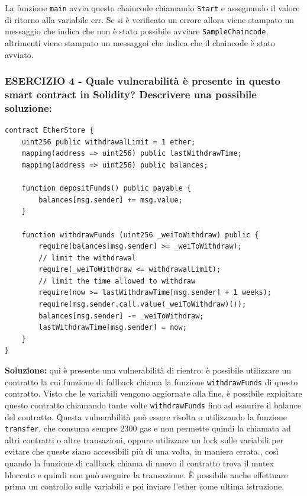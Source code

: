 La funzione \texttt{main} avvia questo chaincode chiamando \texttt{Start} e assegnando il valore di ritorno alla variabile err. Se si è verificato un errore allora viene stampato un messaggio che indica che non è stato possibile avviare \texttt{SampleChaincode}, altrimenti viene stampato un messaggoi che indica che il chaincode è stato avviato.

\vspace{5mm}

\subsubsection{ESERCIZIO 4 - Quale vulnerabilità è presente in questo smart contract in Solidity? Descrivere una possibile soluzione:}
\begin{lstlisting}[language=Solidity]
contract EtherStore {
    uint256 public withdrawalLimit = 1 ether;
    mapping(address => uint256) public lastWithdrawTime;
    mapping(address => uint256) public balances;

    function depositFunds() public payable {
        balances[msg.sender] += msg.value;
    }

    function withdrawFunds (uint256 _weiToWithdraw) public {
        require(balances[msg.sender] >= _weiToWithdraw);
        // limit the withdrawal
        require(_weiToWithdraw <= withdrawalLimit);
        // limit the time allowed to withdraw
        require(now >= lastWithdrawTime[msg.sender] + 1 weeks);
        require(msg.sender.call.value(_weiToWithdraw)());
        balances[msg.sender] -= _weiToWithdraw;
        lastWithdrawTime[msg.sender] = now;
    }
}
\end{lstlisting}
\textbf{Soluzione:} qui è presente una vulnerabilità di rientro: è possibile utilizzare un contratto la cui funzione di fallback chiama la funzione \texttt{withdrawFunds} di questo contratto. Visto che le variabili vengono aggiornate alla fine, è possibile exploitare questo contratto chiamando tante volte \texttt{withdrawFunds} fino ad esaurire il balance del contratto. Questa vulnerabilità può essere risolta o utilizzando la funzione \texttt{transfer}, che consuma sempre 2300 gas e non permette quindi la chiamata ad altri contratti o altre transazioni, oppure utilizzare un lock sulle variabili per evitare che queste siano accessibili più di una volta, in maniera errata., così quando la funzione di callback chiama di nuovo il contratto trova il mutex bloccato e quindi non può eseguire la transazione. È possibile anche effettuare prima un controllo sulle variabili e poi inviare l'ether come ultima istruzione.

